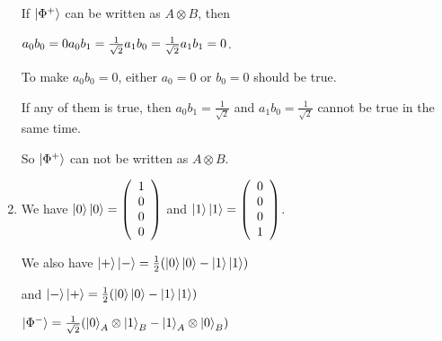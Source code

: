 \documentclass{article}
\begin{document}
\begin{enumerate}
        If $\ket{\Phi^+}$ can be written as $A\otimes B$, then
        
        $a_0b_0=0\\a_0b_1=\frac{1}{\sqrt{2}}\\a_1b_0=\frac{1}{\sqrt{2}}\\a_1b_1=0$.

        To make $a_0b_0=0$, either $a_0=0$ or $b_0=0$ should be true.

        If any of them is true, then $a_0b_1=\frac{1}{\sqrt{2}}$ and $a_1b_0=\frac{1}{\sqrt{2}}$ cannot be true in the same time.

        So $\ket{\Phi^+}$ can not be written as $A\otimes B$.
        \item We have $\ket{0}\ket{0}=\left(\begin{array}{c}
            1\\0\\0\\0
        \end{array}\right)$ and $\ket{1}\ket{1}=\left(\begin{array}{c}
            0\\0\\0\\1
        \end{array}\right)$.

        We also have
        $\ket{+}\ket{-}=\frac{1}{2}(\ket{0}\ket{0}-\ket{1}\ket{1})$

        and $\ket{-}\ket{+}=\frac{1}{2}(\ket{0}\ket{0}-\ket{1}\ket{1})$
        
        $\ket{\Phi^-}=\frac{1}{\sqrt{2}}(\ket{0}_A\otimes\ket{1}_B-\ket{1}_A\otimes\ket{0}_B)$
        

\end{enumerate}
\end{document}
